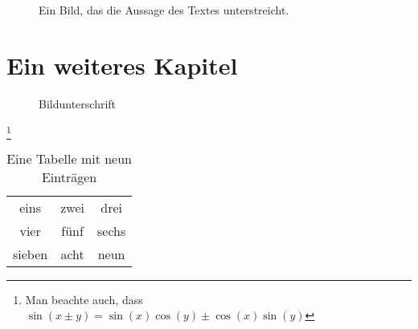 
\blinddocument
{}


\begin{figure}[b]
  \centering
  \caption{Ein Bild, das die Aussage des Textes unterstreicht.}
  \label{picture - statement}
\end{figure}







\chapter{Ein weiteres Kapitel}

\begin{figure}[h]
  \centering
  \caption{Bildunterschrift}
  \label{picture - introduction}
\end{figure}

\Blindtext\footnote{Man beachte auch, dass $\sin(x\pm y) = \sin(x)\cos(y) \pm \cos(x)\sin(y)$}

\vfill

\begin{table}[h]
  \centering
  \begin{tabular}{ccc}
  \toprule
  eins & zwei & drei\\
  vier & fünf & sechs\\
  sieben & acht & neun\\
  \bottomrule
  \end{tabular}
  \caption{Eine Tabelle mit neun Einträgen}
  \label{table - nine entries}
\end{table}

